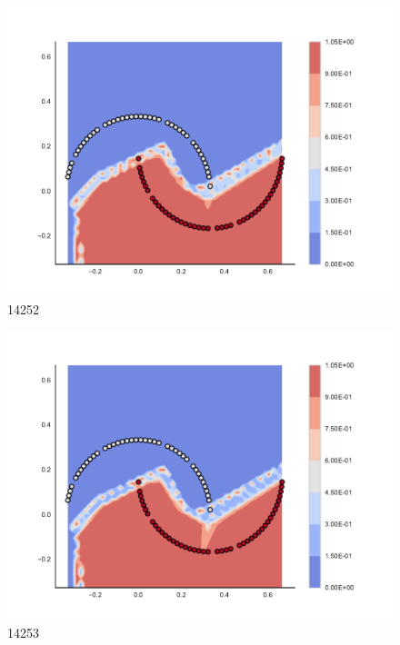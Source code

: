 \begin{subfigure}[b]{0.09\textwidth}
    \includegraphics[clip, trim=2.35cm 1.75cm 4.5cm 0cm,width=\textwidth]{img/convergence/14252.pdf}
    \caption{14252}
    \label{fig:convergence_14252}
\end{subfigure}
%
\begin{subfigure}[b]{0.09\textwidth}
    \includegraphics[clip, trim=2.35cm 1.75cm 4.5cm 0cm,width=\textwidth]{img/convergence/14253.pdf}
    \caption{14253}
    \label{fig:convergence_14253}
\end{subfigure}
%
